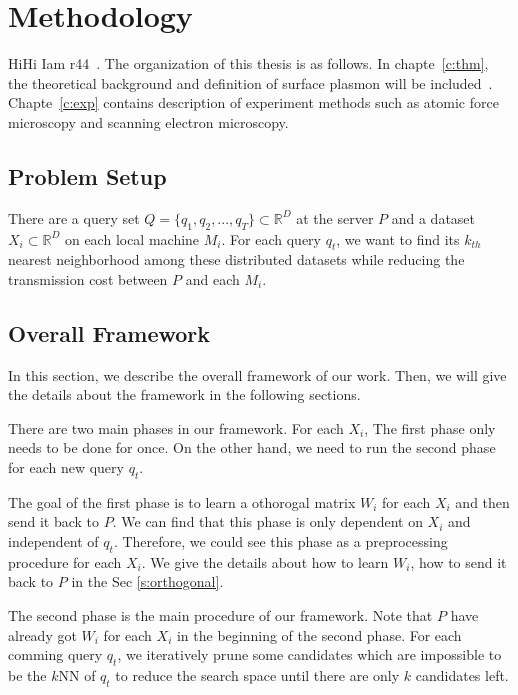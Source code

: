 \chapter{Methodology}
\label{c:method}

HiHi Iam r44~. The organization of this thesis is as follows. In chapte~\ref{c:thm}, the theoretical background and definition of surface plasmon will be included~\cite{maier2007plasmonics}. Chapte~\ref{c:exp} contains description of experiment methods such as atomic force microscopy and scanning electron microscopy. 

\section{Problem Setup}
\label{s:probsetup}
There are a query set $Q={\{q_1,q_2,...,q_T\}}\subset\mathbb{R}^D$ at the server $P$ and a dataset $X_i\subset\mathbb{R}^D$ on each local machine $M_i$.  For each query $q_t$, we want to find its $k_{th}$ nearest neighborhood among these distributed datasets while reducing the transmission cost between $P$ and each $M_i$.

\section{Overall Framework}
\label{s:overall}
In this section, we describe the overall framework of our work.  Then, we will give the details about the framework in the following sections.

There are two main phases in our framework.  For each $X_i$, The first phase only needs to be done for once.  On the other hand, we need to run the second phase for each new query $q_t$.

The goal of the first phase is to learn a othorogal matrix $W_i$ for each $X_i$ and then send it back to $P$.  We can find that this phase is only dependent on $X_i$ and independent of $q_t$.  Therefore, we could see this phase as a preprocessing procedure for each $X_i$.  We give the details about how to learn $W_i$, how to send it back to $P$ in the Sec \ref{s:orthogonal}.

The second phase is the main procedure of our framework.  Note that $P$ have already got $W_i$ for each $X_i$ in the beginning of the second phase. For each comming query $q_t$, we iteratively prune some candidates which are impossible to be the $k$NN of $q_t$ to reduce the search space until there are only $k$ candidates left.

